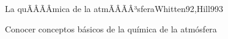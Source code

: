 \begin{sumilla}
\begin{unit}{La quÃÂÃÂ­mica de la atmÃÂÃÂ³sfera}{Whitten92,Hill99}{3}
   \begin{objetivos}
      \item Conocer conceptos b\'asicos de la qu\'imica de la atm\'osfera
   \end{objetivos}
\end{unit}

\begin{bibliografia}
\end{bibliografia}
\end{sumilla}



